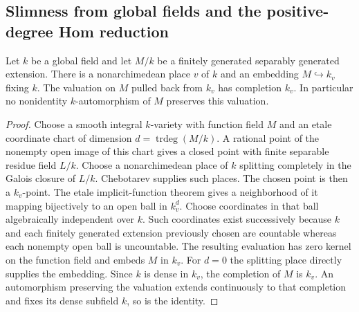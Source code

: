 \subsection{Slimness from global fields and the positive-degree Hom reduction}

\begin{lemma}
\label{A:local-embedding}
Let $k$ be a global field and let $M/k$ be a finitely
 generated separably generated extension.  There is a
nonarchimedean place $v$ of $k$ and an embedding
$M\hookrightarrow k_v$ fixing $k$.  The valuation on $M$
pulled back from $k_v$ has completion $k_v$.  In particular
no nonidentity $k$-automorphism of $M$ preserves this
valuation.
\end{lemma}
\begin{proof}
Choose a smooth integral $k$-variety with function field
$M$ and an etale coordinate chart of dimension
$d=\operatorname{trdeg}(M/k)$.  A rational point of the
nonempty open image of this chart gives a closed point
with finite separable residue field $L/k$.  Choose a
nonarchimedean place of $k$ splitting completely in the
Galois closure of $L/k$.  Chebotarev supplies such places.
The chosen point is then a $k_v$-point.  The etale
implicit-function theorem gives a neighborhood of it
mapping bijectively to an open ball in $k_v^d$.
Choose coordinates in that ball algebraically independent
over $k$.  Such coordinates exist successively because
$k$ and each finitely generated extension previously
chosen are countable whereas each nonempty open ball
is uncountable.  The resulting evaluation has zero
kernel on the function field and embeds $M$ in $k_v$.
For $d=0$ the splitting place directly supplies the
embedding.  Since $k$ is dense in $k_v$, the completion
of $M$ is $k_v$.  An automorphism preserving the valuation
extends continuously to that completion and fixes its
dense subfield $k$, so is the identity.
\end{proof}

